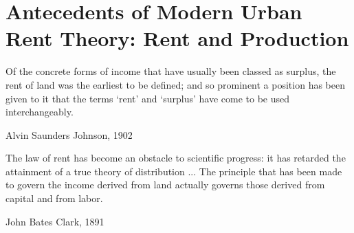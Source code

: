 \chapter{Antecedents of Modern Urban Rent Theory: Rent and Production} \label{chapter-rent}

\epigraph{Of the concrete forms of income that have usually been classed as surplus, the rent of land was the earliest to be defined; and so prominent a position has been given to it that the terms `rent' and `surplus' have come to be used interchangeably.}{Alvin Saunders Johnson, 1902 \cite{johnsonRentModernEconomic1902}}
\epigraph{The law of rent has become an obstacle to scientific progress: it has retarded the attainment of a true theory of distribution ... %
The principle that has been made to govern the income derived from land actually governs those derived from capital and from labor. 
}{John Bates Clark, 1891 \cite{clarkDistributionDeterminedLaw1891}}

